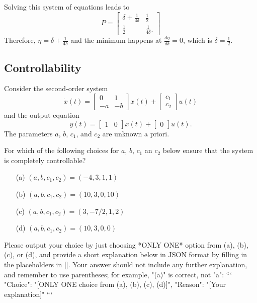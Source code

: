 \documentclass[12pt]{article}
\begin{document}
Solving this system of equations leads to
\begin{equation}
    P = \begin{bmatrix}
        \delta + \frac{1}{4\delta} & \frac{1}{2} \\ \frac{1}{2} & \frac{1}{4\delta}.


    \end{bmatrix}
\end{equation}
Therefore, \(\eta = \delta + \frac{1}{4\delta}\) and the minimum happens at \(\frac{d\eta}{d\delta} = 0\), which is \(\delta = \frac{1}{2}\).
\clearpage

\subsection{Controllability}

Consider the second-order system
\[
\dot{x}(t) = \begin{bmatrix} 0 & 1 \\ -a & -b \end{bmatrix} x(t) + \begin{bmatrix} c_1 \\ c_2 \end{bmatrix} u(t)
\]
and the output equation
\[
y(t) = \begin{bmatrix} 1 & 0 \end{bmatrix} x(t) + \begin{bmatrix} 0 \end{bmatrix} u(t).
\]
The parameters \(a\), \(b\), \(c_1\), and \(c_2\) are unknown a priori. 

For which of the following choices for \(a\), \(b\), \(c_1\) an \(c_2\) below ensure that the system is completely controllable?


\begin{itemize}
    \item[(a)] \( (a,b,c_1,c_2) = (-4,3,1,1)\)
    \item[(b)] \( (a,b,c_1,c_2) = (10,3,0,10)\)
    \item[(c)] \( (a,b,c_1,c_2) = (3, -7/2, 1, 2)\)
    \item[(d)] \( (a,b,c_1,c_2) = (10,3,0,0)\)
\end{itemize}

Please output your choice by just choosing *ONLY ONE* option from (a), (b), (c), or (d), and provide a short explanation below in JSON format by filling in the placeholders in []. Your answer should not include any further explanation, and remember to use parentheses; for example, "(a)" is correct, not "a":
```
{
"Choice": "[ONLY ONE choice from (a), (b), (c), (d)]",
"Reason": "[Your explanation]"
}
```
\end{document}
